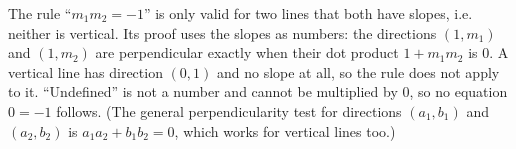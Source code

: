 The rule ``$m_1m_2=-1$'' is only valid for two lines that both have slopes, i.e. neither is vertical. Its proof uses the slopes as numbers: the directions $(1,m_1)$ and $(1,m_2)$ are perpendicular exactly when their dot product $1+m_1m_2$ is $0$. A vertical line has direction $(0,1)$ and no slope at all, so the rule does not apply to it. ``Undefined'' is not a number and cannot be multiplied by $0$, so no equation $0=-1$ follows. (The general perpendicularity test for directions $(a_1,b_1)$ and $(a_2,b_2)$ is $a_1a_2+b_1b_2=0$, which works for vertical lines too.)
